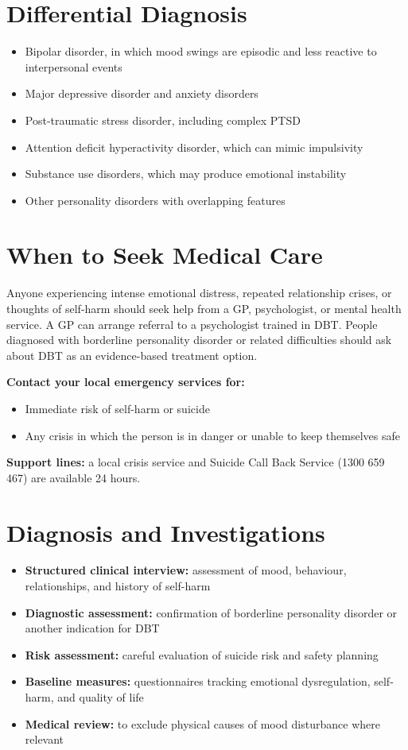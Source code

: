 \section*{Differential Diagnosis}
\begin{itemize}
    \item Bipolar disorder, in which mood swings are episodic and less reactive to interpersonal events
    \item Major depressive disorder and anxiety disorders
    \item Post-traumatic stress disorder, including complex PTSD
    \item Attention deficit hyperactivity disorder, which can mimic impulsivity
    \item Substance use disorders, which may produce emotional instability
    \item Other personality disorders with overlapping features
\end{itemize}

\section*{When to Seek Medical Care}
Anyone experiencing intense emotional distress, repeated relationship crises, or thoughts of self-harm should seek help from a GP, psychologist, or mental health service. A GP can arrange referral to a psychologist trained in DBT. People diagnosed with borderline personality disorder or related difficulties should ask about DBT as an evidence-based treatment option.

\textbf{Contact your local emergency services for:}
\begin{itemize}
    \item Immediate risk of self-harm or suicide
    \item Any crisis in which the person is in danger or unable to keep themselves safe
\end{itemize}
\textbf{Support lines:} a local crisis service and Suicide Call Back Service (1300 659 467) are available 24 hours.

\section*{Diagnosis and Investigations}
\begin{itemize}
    \item \textbf{Structured clinical interview:} assessment of mood, behaviour, relationships, and history of self-harm
    \item \textbf{Diagnostic assessment:} confirmation of borderline personality disorder or another indication for DBT
    \item \textbf{Risk assessment:} careful evaluation of suicide risk and safety planning
    \item \textbf{Baseline measures:} questionnaires tracking emotional dysregulation, self-harm, and quality of life
    \item \textbf{Medical review:} to exclude physical causes of mood disturbance where relevant
\end{itemize}

